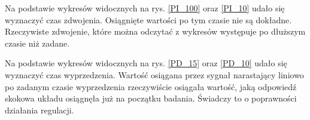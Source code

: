 \documentclass[12pt]{article}
\begin{document}
Na podstawie wykresów widocznych na rys. \ref{PI_100} oraz \ref{PI_10} udało się wyznaczyć czas zdwojenia. Osiągnięte wartości po tym czasie nie są dokładne. Rzeczywiste zdwojenie, które można odczytać z wykresów występuje po dłuższym czasie niż zadane.

Na podstawie wykresów widocznych na rys. \ref{PD_15} oraz \ref{PD_10} udało się wyznaczyć czas wyprzedzenia. Wartość osiągana przez sygnał narastający liniowo po zadanym czasie wyprzedzenia rzeczywiście osiągała wartość, jaką odpowiedź skokowa układu osiągnęła już na początku badania. Świadczy to o poprawności działania regulacji.
\end{document}
